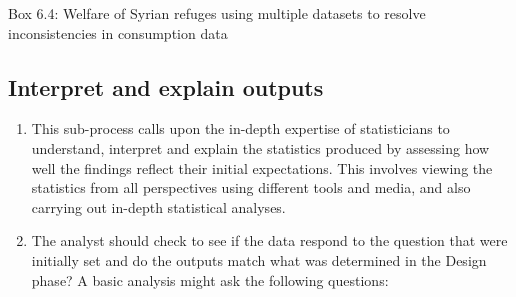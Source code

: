 \documentclass[
]{article}
\begin{document}
Box 6.4: Welfare of Syrian refuges using multiple datasets to resolve
inconsistencies in consumption data

\hypertarget{section}{%
\subsubsection{}\label{section}}

\hypertarget{interpret-and-explain-outputs-1}{%
\subsection{Interpret and explain outputs}\label{interpret-and-explain-outputs-1}}

\begin{enumerate}
\def\labelenumi{\arabic{enumi}.}
\setcounter{enumi}{472}
\item
  This sub-process calls upon the in-depth expertise of statisticians
  to understand, interpret and explain the statistics produced by
  assessing how well the findings reflect their initial expectations.
  This involves viewing the statistics from all perspectives using
  different tools and media, and also carrying out in-depth
  statistical analyses.
\item
  The analyst should check to see if the data respond to the question
  that were initially set and do the outputs match what was determined
  in the Design phase? A basic analysis might ask the following
  questions:
\end{enumerate}
\end{document}
